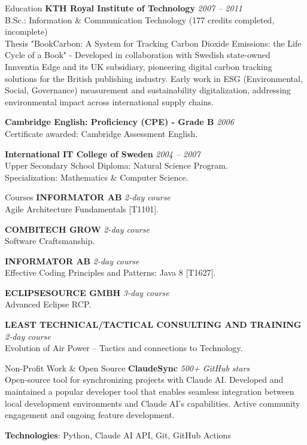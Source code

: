 \documentclass{resume}
\begin{document}
\begin{rSection}{Education}
{\bf KTH Royal Institute of Technology}
\hfill {\em 2007 -- 2011 } \\
{ B.Sc.: Information \& Communication Technology (177 credits completed, incomplete) } \\
{ Thesis "BookCarbon: A System for Tracking Carbon Dioxide Emissions: the Life Cycle of a Book" - Developed in collaboration with Swedish state-owned Innventia Edge and its UK subsidiary, pioneering digital carbon tracking solutions for the British publishing industry. Early work in ESG (Environmental, Social, Governance) measurement and sustainability digitalization, addressing environmental impact across international supply chains. }

{\bf Cambridge English: Proficiency (CPE) - Grade B}
\hfill {\em 2006 } \\
{ Certificate awarded: Cambridge Assessment English. }

{\bf International IT College of Sweden}
\hfill {\em 2004 -- 2007 } \\
{ Upper Secondary School Diploma: Natural Science Program. } \\
{ Specialization: Mathematics \& Computer Science. }
\end{rSection}

\begin{rSection}{Courses}
{\bf INFORMATOR AB}
\hfill {\em 2-day course } \\
{ Agile Architecture Fundamentals [T1101]. } %

{\bf COMBITECH GROW}
\hfill {\em 2-day course } \\
{ Software Craftsmanship. } %

{\bf INFORMATOR AB}
\hfill {\em 2-day course } \\
{ Effective Coding Principles and Patterns: Java 8 [T1627]. } %

{\bf ECLIPSESOURCE GMBH}
\hfill {\em 3-day course } \\
{ Advanced Eclipse RCP. } %

{\bf LEAST TECHNICAL/TACTICAL CONSULTING AND TRAINING}
\hfill {\em 2-day course } \\
{ Evolution of Air Power – Tactics and connections to Technology. } %
\end{rSection}

\begin{rSection}{Non-Profit Work \& Open Source}
{\bf ClaudeSync}
\hfill {\em 500+ GitHub stars } \\
{ Open-source tool for synchronizing projects with Claude AI. Developed and maintained a popular developer tool that enables seamless integration between local development environments and Claude AI's capabilities. Active community engagement and ongoing feature development. }

{\bf Technologies}: Python, Claude AI API, Git, GitHub Actions
\end{rSection}
\end{document}
